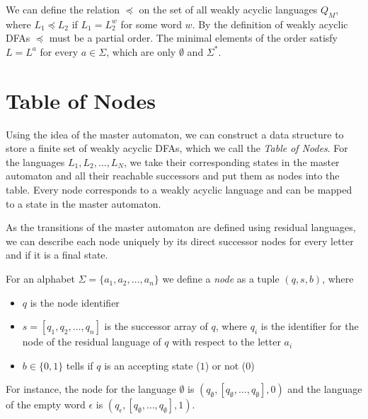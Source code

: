 \par

We can define the relation $\preceq$ on the set of all weakly acyclic languages $Q_{M}$, where $L_{1} \preceq L_{2}$ if $L_{1} = L_{2}^{w}$ for some word $w$. By the definition of weakly acyclic DFAs $\preceq$ must be a partial order. The minimal elements of the order satisfy $L = L^{a}$ for every $a \in \Sigma$, which are only $\emptyset$ and $\Sigma^{*}$.



\section{Table of Nodes}
Using the idea of the master automaton, we can construct a data structure to store a finite set of weakly acyclic DFAs, which we call the \textit{Table of Nodes}. For the languages $L_{1},L_{2},\dots,L_{N}$, we take their corresponding states in the master automaton and all their reachable successors and put them as nodes into the table. Every node corresponds to a weakly acyclic language and can be mapped to a state in the master automaton.

\par 

As the transitions of the master automaton are defined using residual languages, we can describe each node uniquely by its direct successor nodes for every letter and if it is a final state.

\par

For an alphabet $\Sigma = \{a_{1}, a_{2},\dots,a_{n} \}$ we define a \textit{node} as a tuple $(q,s,b)$, where
\begin{itemize}[--,noitemsep]
\item $q$ is the node identifier 
\item $s = [q_{1},q_{2},\dots,q_{n}]$ is the successor array of $q$, where $q_{i}$ is the identifier for the node of the residual language of $q$ with respect to the letter $a_{i}$
\item $b \in \{0,1\}$ tells if $q$ is an accepting state ($1$) or not ($0$)
\end{itemize}
For instance, the node for the language $\emptyset$ is $(q_{\emptyset},[q_{\emptyset},\dots,q_{\emptyset}],0)$ and the language of the empty word $\epsilon$ is $(q_{\epsilon},[q_{\emptyset},\dots,q_{\emptyset}],1)$.

